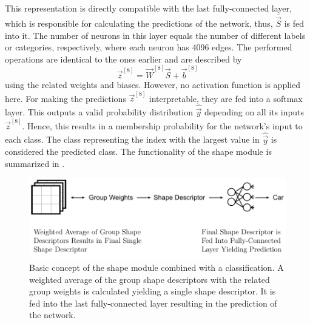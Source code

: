This representation is directly compatible with the last fully-connected layer, which is responsible for calculating the predictions of the network, thus, $\bar{\vec{S}}$ is fed into it.
The number of neurons in this layer equals the number of different labels or categories, respectively, where each neuron has 4096 edges.
The performed operations are identical to the ones earlier and are described by
\begin{equation}
	\vec{z}^{[8]} = \vec{W}^{[8]} \vec{S} + \vec{b}^{[8]}
\end{equation}
using the related weights and biases.
However, no activation function is applied here.
For making the predictions $\vec{z}^{[8]}$ interpretable, they are fed into a softmax layer.
This outputs a valid probability distribution $\hat{\vec{y}}$ depending on all its inputs $\vec{z}^{[8]}$.
Hence, this results in a membership probability for the network's input to each class.
The class representing the index with the largest value in $\hat{\vec{y}}$ is considered the predicted class. The functionality of the shape module is summarized in .
\begin{figure}
	\centering
	\includegraphics[]{images/shape_module_final_shape.pdf}
	\caption[Basic concept of the shape module]{Basic concept of the shape module combined with a classification. A weighted average of the group shape descriptors with the related group weights is calculated yielding a single shape descriptor. It is fed into the last fully-connected layer resulting in the prediction of the network.}
	\label{fig:shape-module-final-shape}
\end{figure}